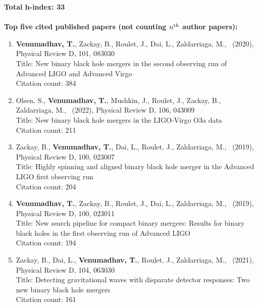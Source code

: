 \documentclass{article}
\newlength{\cvindent}
\newcommand{\cvsectionstart}{\vspace{6pt}}
\newcommand{\cvsectionend}{\vspace{10pt}}
\newenvironment{cvlist}{%
  \begin{list}{}{%
    \setlength{\leftmargin}{\cvindent}%
    \setlength{\rightmargin}{0pt}%
    \setlength{\topsep}{0pt}%
    \setlength{\partopsep}{0pt}%
    \setlength{\parsep}{0pt}%
    \setlength{\itemsep}{0pt}%
  }%
  \item\relax
}{%
  \end{list}
}
\begin{document}
\begin{cvlist}
\cvsectionstart
\textbf{Total h-index: 33} \\
\\
\textbf{Top five cited published papers (not counting $n^{\rm th}$ author papers):} \\
\begin{enumerate}[leftmargin=*,itemsep=0.35em,topsep=0.35em]
\item \textbf{Venumadhav, T.}, Zackay, B., Roulet, J., Dai, L., Zaldarriaga, M., \ (2020), Physical Review D, 101, 083030 \\
Title: New binary black hole mergers in the second observing run of Advanced LIGO and Advanced Virgo \\
Citation count: 384 \\
\item Olsen, S., \textbf{Venumadhav, T.}, Mushkin, J., Roulet, J., Zackay, B., Zaldarriaga, M., \ (2022), Physical Review D, 106, 043009 \\
Title: New binary black hole mergers in the LIGO-Virgo O3a data \\
Citation count: 211 \\
\item Zackay, B., \textbf{Venumadhav, T.}, Dai, L., Roulet, J., Zaldarriaga, M., \ (2019), Physical Review D, 100, 023007 \\
Title: Highly spinning and aligned binary black hole merger in the Advanced LIGO first observing run \\
Citation count: 204 \\
\item \textbf{Venumadhav, T.}, Zackay, B., Roulet, J., Dai, L., Zaldarriaga, M., \ (2019), Physical Review D, 100, 023011 \\
Title: New search pipeline for compact binary mergers: Results for binary black holes in the first observing run of Advanced LIGO \\
Citation count: 194 \\
\item Zackay, B., Dai, L., \textbf{Venumadhav, T.}, Roulet, J., Zaldarriaga, M., \ (2021), Physical Review D, 104, 063030 \\
Title: Detecting gravitational waves with disparate detector responses: Two new binary black hole mergers \\
Citation count: 161 \\
\end{enumerate}
\end{cvlist}
\cvsectionend
\end{document}
